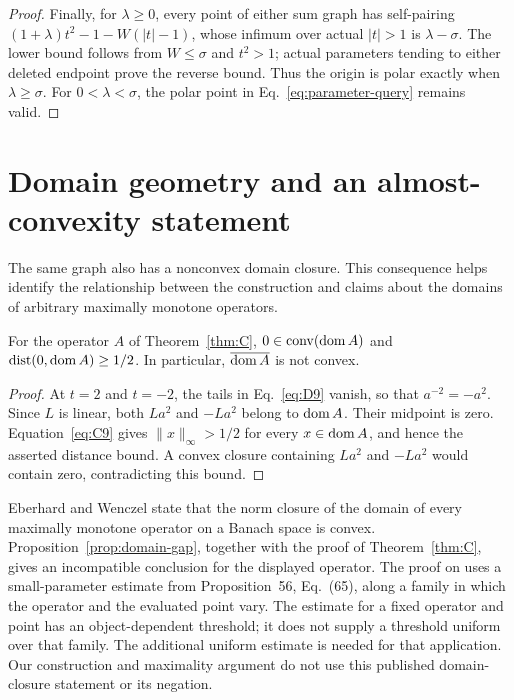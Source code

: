 \begin{proof}
Finally, for $\lambda\ge0$, every point of either sum graph has
self-pairing
$(1+\lambda)t^2-1-W(|t|-1)$, whose infimum over actual $|t|>1$ is
$\lambda-\sigma$. The lower bound follows from $W\le\sigma$ and
$t^2>1$; actual parameters tending to either deleted endpoint prove
the reverse bound. Thus the origin is polar exactly when
$\lambda\ge\sigma$. For $0<\lambda<\sigma$, the polar point in
Eq.~\eqref{eq:parameter-query} remains valid.
\end{proof}


\section{Domain geometry and an almost-convexity statement}
\label{sec:domain-comparison}
The same graph also has a nonconvex domain closure. This consequence
helps identify the relationship between the construction and claims
about the domains of arbitrary maximally monotone operators.

\begin{proposition}\label{prop:domain-gap}
For the operator $A$ of Theorem~\ref{thm:C},
$0\in\operatorname{conv}(\operatorname{dom} A)$ and
$\operatorname{dist}(0,\operatorname{dom} A)\ge1/2$.
In particular, $\overline{\operatorname{dom} A}$ is not convex.
\end{proposition}
\begin{proof}
At $t=2$ and $t=-2$, the tails in Eq.~\eqref{eq:D9} vanish, so that
$a^{-2}=-a^2$. Since $L$ is linear, both $La^2$ and $-La^2$ belong
to $\operatorname{dom} A$. Their midpoint is zero. Equation~\eqref{eq:C9} gives
$\|x\|_\infty>1/2$ for every $x\in\operatorname{dom} A$, and hence the asserted
distance bound. A convex closure containing $La^2$ and $-La^2$ would
contain zero, contradicting this bound.
\end{proof}

Eberhard and Wenczel \cite[Theorem~57]{eberhardwenczel2024} state that
the norm closure of the domain of every maximally monotone operator on
a Banach space is convex. Proposition~\ref{prop:domain-gap}, together
with the proof of Theorem~\ref{thm:C}, gives an incompatible
conclusion for the displayed operator. The proof on
\cite[pp.~39--40]{eberhardwenczel2024} uses a small-parameter estimate
from Proposition~56, Eq.~(65), along a family in which the operator and
the evaluated point vary. The estimate for a fixed operator and point
has an object-dependent threshold; it does not supply a threshold
uniform over that family. The additional uniform estimate is needed
for that application. Our construction and maximality argument do not
use this published domain-closure statement or its negation.

